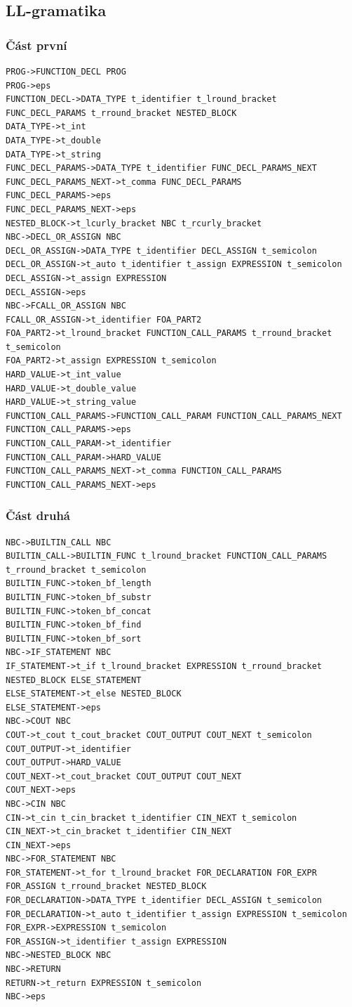 \documentclass[a4paper, 12pt]{article}
\begin{document}
\begin{landscape}
\subsection{LL-gramatika} \label{subsec:llgram}

\subsubsection*{Část první}
\begin{verbatim}
PROG->FUNCTION_DECL PROG
PROG->eps
FUNCTION_DECL->DATA_TYPE t_identifier t_lround_bracket FUNC_DECL_PARAMS t_rround_bracket NESTED_BLOCK
DATA_TYPE->t_int
DATA_TYPE->t_double
DATA_TYPE->t_string
FUNC_DECL_PARAMS->DATA_TYPE t_identifier FUNC_DECL_PARAMS_NEXT
FUNC_DECL_PARAMS_NEXT->t_comma FUNC_DECL_PARAMS
FUNC_DECL_PARAMS->eps
FUNC_DECL_PARAMS_NEXT->eps
NESTED_BLOCK->t_lcurly_bracket NBC t_rcurly_bracket
NBC->DECL_OR_ASSIGN NBC
DECL_OR_ASSIGN->DATA_TYPE t_identifier DECL_ASSIGN t_semicolon
DECL_OR_ASSIGN->t_auto t_identifier t_assign EXPRESSION t_semicolon
DECL_ASSIGN->t_assign EXPRESSION
DECL_ASSIGN->eps
NBC->FCALL_OR_ASSIGN NBC
FCALL_OR_ASSIGN->t_identifier FOA_PART2
FOA_PART2->t_lround_bracket FUNCTION_CALL_PARAMS t_rround_bracket t_semicolon
FOA_PART2->t_assign EXPRESSION t_semicolon
HARD_VALUE->t_int_value
HARD_VALUE->t_double_value
HARD_VALUE->t_string_value
FUNCTION_CALL_PARAMS->FUNCTION_CALL_PARAM FUNCTION_CALL_PARAMS_NEXT
FUNCTION_CALL_PARAMS->eps
FUNCTION_CALL_PARAM->t_identifier
FUNCTION_CALL_PARAM->HARD_VALUE
FUNCTION_CALL_PARAMS_NEXT->t_comma FUNCTION_CALL_PARAMS
FUNCTION_CALL_PARAMS_NEXT->eps
\end{verbatim}
\newpage

\subsubsection*{Část druhá}
\begin{verbatim}
NBC->BUILTIN_CALL NBC
BUILTIN_CALL->BUILTIN_FUNC t_lround_bracket FUNCTION_CALL_PARAMS t_rround_bracket t_semicolon
BUILTIN_FUNC->token_bf_length
BUILTIN_FUNC->token_bf_substr
BUILTIN_FUNC->token_bf_concat
BUILTIN_FUNC->token_bf_find
BUILTIN_FUNC->token_bf_sort
NBC->IF_STATEMENT NBC
IF_STATEMENT->t_if t_lround_bracket EXPRESSION t_rround_bracket NESTED_BLOCK ELSE_STATEMENT
ELSE_STATEMENT->t_else NESTED_BLOCK
ELSE_STATEMENT->eps
NBC->COUT NBC
COUT->t_cout t_cout_bracket COUT_OUTPUT COUT_NEXT t_semicolon
COUT_OUTPUT->t_identifier
COUT_OUTPUT->HARD_VALUE
COUT_NEXT->t_cout_bracket COUT_OUTPUT COUT_NEXT
COUT_NEXT->eps
NBC->CIN NBC
CIN->t_cin t_cin_bracket t_identifier CIN_NEXT t_semicolon
CIN_NEXT->t_cin_bracket t_identifier CIN_NEXT
CIN_NEXT->eps
NBC->FOR_STATEMENT NBC
FOR_STATEMENT->t_for t_lround_bracket FOR_DECLARATION FOR_EXPR FOR_ASSIGN t_rround_bracket NESTED_BLOCK
FOR_DECLARATION->DATA_TYPE t_identifier DECL_ASSIGN t_semicolon
FOR_DECLARATION->t_auto t_identifier t_assign EXPRESSION t_semicolon
FOR_EXPR->EXPRESSION t_semicolon
FOR_ASSIGN->t_identifier t_assign EXPRESSION
NBC->NESTED_BLOCK NBC
NBC->RETURN
RETURN->t_return EXPRESSION t_semicolon
NBC->eps
\end{verbatim}
\end{landscape}
\newpage
\end{document}
